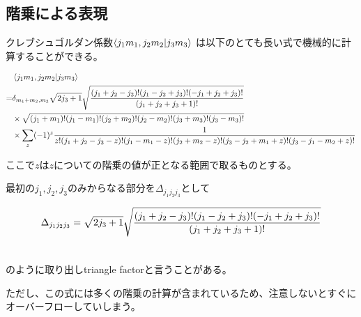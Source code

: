 \subsection{階乗による表現}

クレブシュゴルダン係数$\bra{j_1m_1,j_2m_2}\ket{j_3m_3}$
は以下のとても長い式で機械的に計算することができる。

\begin{align}\label{cg_fact}
    &\bra{j_1m_1, j_2m_2}\ket{j_3m_3} \\ \notag 
    = 
    &\delta_{m_1 + m_2, m_3}
    \sqrt{2j_3 + 1}
    \sqrt{\frac{(j_1 + j_2 - j_3)!(j_1 - j_2 + j_3)!(-j_1 + j_2 + j_3)!}{(j_1 + j_2 + j_3 + 1)!}}  \\ \notag
    &\times 
    \sqrt{(j_1 + m_1)!(j_1 -m_1)!(j_2 + m_2)!(j_2 - m_2)!(j_3 + m_3)!(j_3 - m_3)!} \\ \notag
    &\times
    \sum_z (-1)^z \frac{1}{z!(j_1 + j_2 - j_3 - z)!(j_1 - m_1 - z)!(j_2 + m_2 - z)!(j_3 - j_2 + m_1 + z)!(j_3 - j_1 - m_2 + z)!}
\end{align}

ここで$z$は$z$についての階乗の値が正となる範囲で取るものとする。

最初の$j_1,j_2,j_3$のみからなる部分を$\Delta_{j_1j_2j_3}$として

\begin{align}
    \Delta_{j_1j_2j_3} = \sqrt{2j_3 + 1}
    \sqrt{\frac{(j_1 + j_2 - j_3)!(j_1 - j_2 + j_3)!(-j_1 + j_2 + j_3)!}{(j_1 + j_2 + j_3 + 1)!}}  \\ \notag
\end{align}

のように取り出しtriangle factorと言うことがある。

ただし、この式には多くの階乗の計算が含まれているため、注意しないとすぐにオーバーフローしていしまう。
